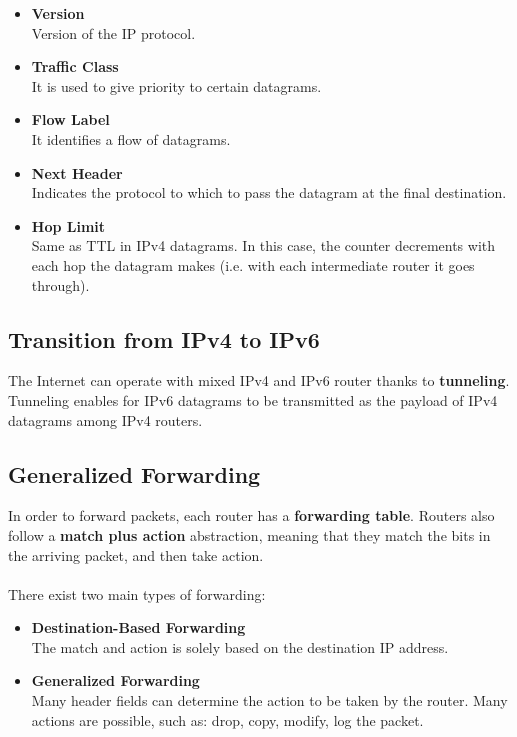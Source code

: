\documentclass{article}
\begin{document}
\begin{itemize}
	\item \textbf{Version}
	\vspace{.2cm} \\
	Version of the IP protocol.
	
	\item \textbf{Traffic Class}
	\vspace{.2cm} \\
	It is used to give priority to certain datagrams.
	
	\item \textbf{Flow Label}
	\vspace{.2cm} \\
	It identifies a flow of datagrams.
	
	\item \textbf{Next Header}
	\vspace{.2cm} \\
	Indicates the protocol to which to pass the datagram at the final destination.
	
	\item \textbf{Hop Limit}
	\vspace{.2cm} \\
	Same as TTL in IPv4 datagrams. In this case, the counter decrements with each hop the datagram makes (i.e. with each intermediate router it goes through).
\end{itemize}

\subsection{Transition from IPv4 to IPv6}
The Internet can operate with mixed IPv4 and IPv6 router thanks to \textbf{tunneling}. Tunneling enables for IPv6 datagrams to be transmitted as the payload of IPv4 datagrams among IPv4 routers.

\subsection{Generalized Forwarding}
In order to forward packets, each router has a \textbf{forwarding table}. Routers also follow a \textbf{match plus  action} abstraction, meaning that they match the bits in the arriving packet, and then take action. \\ \\
There exist two main types of forwarding:

\begin{itemize}
	\item \textbf{Destination-Based Forwarding}
	\vspace{.2cm} \\
	The match and action is solely based on the destination IP address.
	
	\item \textbf{Generalized Forwarding}
	\vspace{.2cm} \\
	Many header fields can determine the action to be taken by the router. Many actions are possible, such as: drop, copy, modify, log the packet.
\end{itemize}
\end{document}
